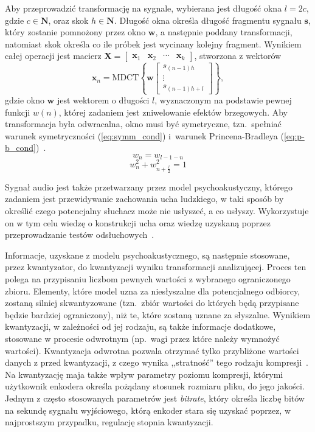 \documentclass[pl,12pt]{aghdpl}
\begin{document}
Aby przeprowadzić transformację na sygnale, wybierana jest długość okna $l =
2c$, gdzie $c \in \bm N$, oraz skok $h \in \bm N$. Długość okna określa długość
fragmentu sygnału $\bm s$, który zostanie pomnożony przez okno $\bm w$, a
następnie poddany transformacji, natomiast skok określa co ile próbek jest
wycinany kolejny fragment. Wynikiem całej operacji jest macierz $\bm X =
\begin{bmatrix}\bm x_1 & \bm x_2 & \cdots  & \bm x_k\end{bmatrix}$, stworzona z
wektorów 
\begin{equation}
  \bm x_n = \text{MDCT}\left\{\bm w\begin{bmatrix}
      s_{(n-1)h}\\\vdots\\s_{(n-1)h+l}
  \end{bmatrix}\right\},
\end{equation}
gdzie okno $\bm w$ jest wektorem o długości $l$, wyznaczonym na podstawie
pewnej funkcji $w(n)$, której zadaniem jest zniwelowanie efektów brzegowych.
Aby transformacja była odwracalna, okno musi być symetryczne, tzn.\ spełniać
warunek symetryczności (\ref{eq:symm_cond}) i~warunek Princena-Bradleya
(\ref{eq:p-b_cond})~\cite{PrincenBradley1986,
WangYaroslavskyVilermoVaananen2000}.
\begin{equation}\label{eq:symm_cond}
  w_n = w_{l-1-n}
\end{equation}
\begin{equation}\label{eq:p-b_cond}
  w_n^2+w_{n+\frac{l}{2}}^2 = 1
\end{equation}

Sygnał audio jest także przetwarzany przez model psychoakustyczny, którego
zadaniem jest przewidywanie zachowania ucha ludzkiego, w taki sposób by
określić czego potencjalny słuchacz może nie usłyszeć, a co usłyszy.
Wykorzystuje on w tym celu wiedzę o konstrukcji ucha oraz wiedzę uzyskaną
poprzez przeprowadzanie testów odsłuchowych~\cite{BosiGoldberg2002}.

Informacje, uzyskane z modelu psychoakustycznego, są następnie stosowane, przez
kwantyzator, do kwantyzacji wyniku transformacji analizującej. Proces ten
polega na przypisaniu liczbom pewnych wartości z wybranego ograniczonego
zbioru. Elementy, które model uzna za niesłyszalne dla potencjalnego odbiorcy,
zostaną silniej skwantyzowane (tzn.\ zbiór wartości do których będą przypisane
będzie bardziej ograniczony), niż te, które zostaną uznane za słyszalne. Wynikiem
kwantyzacji, w zależności od jej rodzaju, są także informacje dodatkowe,
stosowane w procesie odwrotnym (np.\ wagi przez które należy wymnożyć
wartości). Kwantyzacja odwrotna pozwala otrzymać tylko przybliżone wartości
danych z przed kwantyzacji, z czego wynika ,,stratność'' tego rodzaju
kompresji~\cite{Sayood2017}. Na kwantyzację maja także wpływ parametry poziomu
kompresji, którymi użytkownik enkodera określa pożądany stosunek rozmiaru
pliku, do jego jakości. Jednym z często stosowanych parametrów jest
\textit{bitrate}, który określa liczbę bitów na sekundę sygnału wyjściowego,
którą enkoder stara się uzyskać poprzez, w najprostszym przypadku, regulację
stopnia kwantyzacji.
\end{document}

